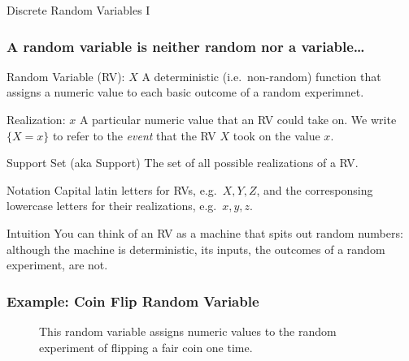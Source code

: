 \documentclass[handout]{beamer}
\date{Lecture \# 8}
\begin{document}
 


\begin{frame}[plain]
	\titlepage 
	

\end{frame} 


\begin{frame}

\centering \Huge Discrete Random Variables I

\end{frame}
\def\RVraw{(-2.5,0) circle [radius=1.7]
	(-2.5,0) circle [radius=1.7]
	(2.5,0) circle [radius=1.7]
	node [above left] at (-3.75,1.25) {$S$}
	node [above right] at (3.75,1.25) {$\mathbb{R}$}
	node [above] at (0,2) {$X\colon S \mapsto \mathbb{R}$}}
\begin{frame}
  \frametitle{A random variable is neither random nor a variable\ldots}
\begin{block}{Random Variable (RV): $X$}
  A deterministic (i.e.\ non-random) function that assigns a numeric value to each basic outcome of a random experimnet.
\end{block}
 
\begin{block}{Realization: $x$}
A particular numeric value that an RV could take on. We write $\{X = x\}$ to refer to the \emph{event} that the RV $X$ took on the value $x$.  
\end{block}
 
\begin{block}{Support Set (aka Support)}
The set of all possible realizations of a RV.
\end{block}
 
\begin{block}{Notation}
Capital latin letters for RVs, e.g.\ $X,Y,Z$, and the corresponsing lowercase letters for their realizations, e.g.\ $x,y,z$.
\end{block}

\begin{block}{Intuition}
  You can think of an RV as a machine that spits out random numbers: although the machine is deterministic, its inputs, the outcomes of a random experiment, are not.
\end{block}
\end{frame}
\begin{frame}
\frametitle{Example: Coin Flip Random Variable}

\begin{figure}
\centering
{}
\caption{This random variable assigns numeric values to the random experiment of flipping a fair coin one time.}
\end{figure}
\end{frame}
\end{document}
